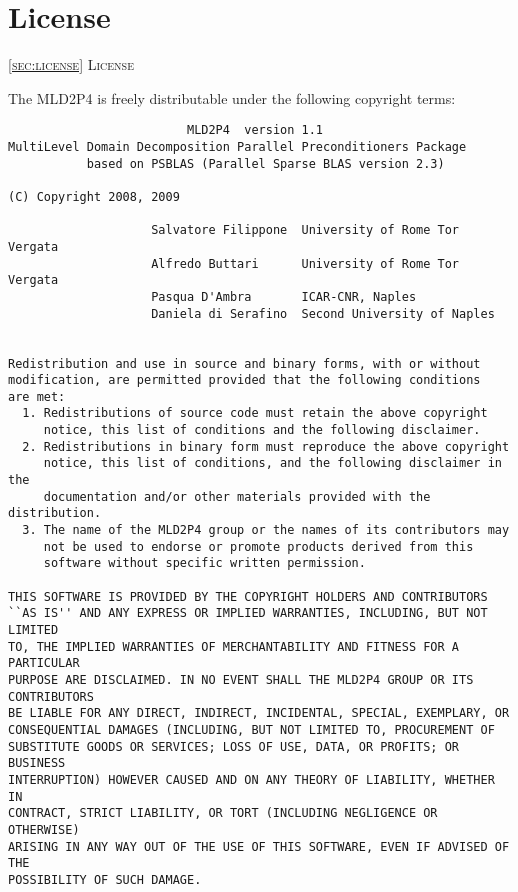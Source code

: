\section{License\label{sec:license}}
         {\textsc{\ref{sec:license} License}}

The MLD2P4 is freely distributable under the following copyright
terms: {\small
\begin{verbatim} 
                         MLD2P4  version 1.1
MultiLevel Domain Decomposition Parallel Preconditioners Package
           based on PSBLAS (Parallel Sparse BLAS version 2.3)

(C) Copyright 2008, 2009

                    Salvatore Filippone  University of Rome Tor Vergata       
                    Alfredo Buttari      University of Rome Tor Vergata
                    Pasqua D'Ambra       ICAR-CNR, Naples
                    Daniela di Serafino  Second University of Naples


Redistribution and use in source and binary forms, with or without
modification, are permitted provided that the following conditions
are met:
  1. Redistributions of source code must retain the above copyright
     notice, this list of conditions and the following disclaimer.
  2. Redistributions in binary form must reproduce the above copyright
     notice, this list of conditions, and the following disclaimer in the
     documentation and/or other materials provided with the distribution.
  3. The name of the MLD2P4 group or the names of its contributors may
     not be used to endorse or promote products derived from this
     software without specific written permission.

THIS SOFTWARE IS PROVIDED BY THE COPYRIGHT HOLDERS AND CONTRIBUTORS
``AS IS'' AND ANY EXPRESS OR IMPLIED WARRANTIES, INCLUDING, BUT NOT LIMITED
TO, THE IMPLIED WARRANTIES OF MERCHANTABILITY AND FITNESS FOR A PARTICULAR
PURPOSE ARE DISCLAIMED. IN NO EVENT SHALL THE MLD2P4 GROUP OR ITS CONTRIBUTORS
BE LIABLE FOR ANY DIRECT, INDIRECT, INCIDENTAL, SPECIAL, EXEMPLARY, OR
CONSEQUENTIAL DAMAGES (INCLUDING, BUT NOT LIMITED TO, PROCUREMENT OF
SUBSTITUTE GOODS OR SERVICES; LOSS OF USE, DATA, OR PROFITS; OR BUSINESS
INTERRUPTION) HOWEVER CAUSED AND ON ANY THEORY OF LIABILITY, WHETHER IN
CONTRACT, STRICT LIABILITY, OR TORT (INCLUDING NEGLIGENCE OR OTHERWISE)
ARISING IN ANY WAY OUT OF THE USE OF THIS SOFTWARE, EVEN IF ADVISED OF THE
POSSIBILITY OF SUCH DAMAGE.
\end{verbatim}
}
